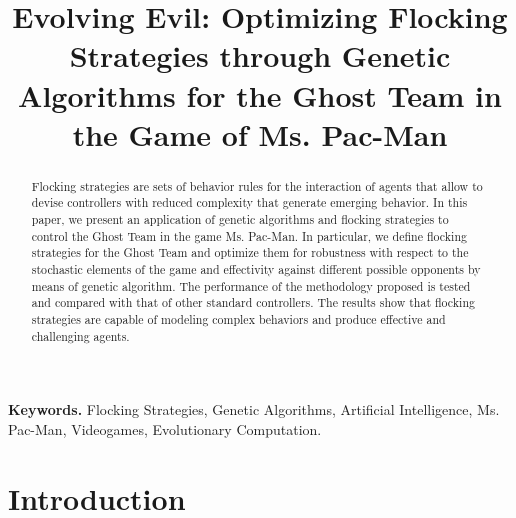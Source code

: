 \documentclass{llncs}
\begin{document}
%
%

\title{Evolving Evil: Optimizing Flocking Strategies through Genetic Algorithms for the Ghost Team in the Game of Ms. Pac-Man}

%
%

\maketitle

%
%
\begin{abstract} 
Flocking strategies are sets of behavior rules for the interaction of agents that allow to devise controllers with reduced complexity that generate emerging behavior. In this paper, we present an application of genetic algorithms and flocking strategies to control the Ghost Team in the game Ms. Pac-Man. In particular, we define flocking strategies for the Ghost Team and optimize them for robustness with respect to the stochastic elements of the game and effectivity against different possible opponents by means of genetic algorithm. The performance of the methodology proposed is tested and compared with that of other standard controllers. The results show that flocking strategies are capable of modeling complex behaviors and produce effective and challenging agents.
\end{abstract}
\textbf{Keywords.} Flocking Strategies, Genetic Algorithms, Artificial Intelligence, Ms. Pac-Man, Videogames, Evolutionary Computation.

%
%
\section{Introduction}
\label{sec:intro}
\end{document}
